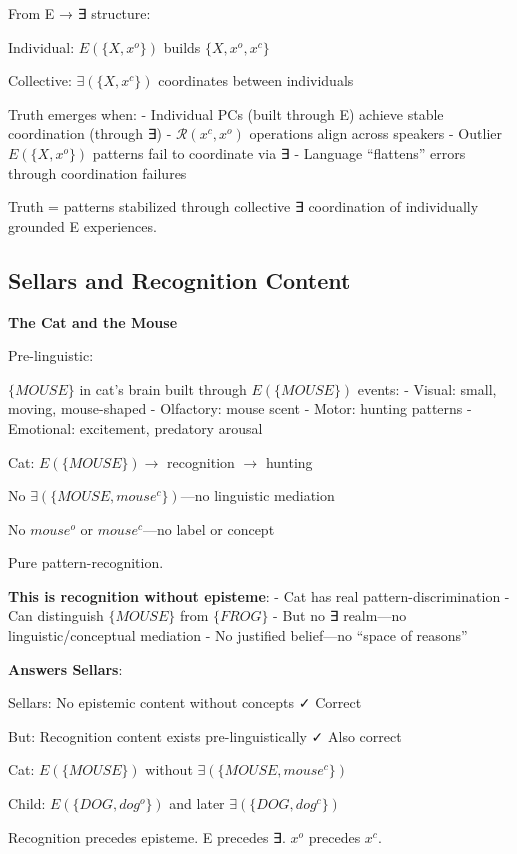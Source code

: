 \documentclass[12pt]{article}
\begin{document}
From E → ∃ structure:

Individual: \(E(\{X, x^o\})\) builds \(\{X, x^o, x^c\}\)

Collective: \(\exists(\{X, x^c\})\) coordinates between individuals

Truth emerges when: - Individual PCs (built through E) achieve stable coordination (through ∃) - \(\mathcal{R}(x^c, x^o)\) operations align across speakers - Outlier \(E(\{X, x^o\})\) patterns fail to coordinate via ∃ - Language ``flattens'' errors through coordination failures

Truth = patterns stabilized through collective ∃ coordination of individually grounded E experiences.

\subsection{Sellars and Recognition Content}\label{sellars-and-recognition-content}

\textbf{The Cat and the Mouse}

Pre-linguistic:

\(\{MOUSE\}\) in cat's brain built through \(E(\{MOUSE\})\) events: - Visual: small, moving, mouse-shaped - Olfactory: mouse scent - Motor: hunting patterns - Emotional: excitement, predatory arousal

Cat: \(E(\{MOUSE\}) \rightarrow\) recognition \(\rightarrow\) hunting

No \(\exists(\{MOUSE, mouse^c\})\)---no linguistic mediation

No \(mouse^o\) or \(mouse^c\)---no label or concept

Pure pattern-recognition.

\textbf{This is recognition without episteme}: - Cat has real pattern-discrimination - Can distinguish \(\{MOUSE\}\) from \(\{FROG\}\) - But no ∃ realm---no linguistic/conceptual mediation - No justified belief---no ``space of reasons''

\textbf{Answers Sellars}:

Sellars: No epistemic content without concepts ✓ Correct

But: Recognition content exists pre-linguistically ✓ Also correct

Cat: \(E(\{MOUSE\})\) without \(\exists(\{MOUSE, mouse^c\})\)

Child: \(E(\{DOG, dog^o\})\) and later \(\exists(\{DOG, dog^c\})\)

Recognition precedes episteme. E precedes ∃. \(x^o\) precedes \(x^c\).
\end{document}
